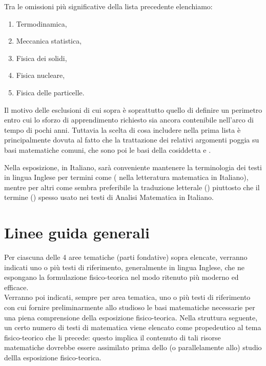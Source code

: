 Tra le omissioni più significative della lista precedente elenchiamo: 
\begin{enumerate}[(1)]
\item Termodinamica,
\item Meccanica statistica,
\item Fisica dei solidi,
\item Fisica nucleare, 
\item Fisica delle particelle. 
\end{enumerate} 

Il motivo delle esclusioni di cui sopra è soprattutto quello di definire un perimetro entro cui lo sforzo di apprendimento richiesto sia ancora contenibile nell'arco di tempo di pochi anni. Tuttavia la scelta di cosa includere nella prima lista è principalmente dovuta al fatto che la trattazione dei relativi argomenti poggia su basi matematiche comuni, che sono poi le basi della cosiddetta   e . 

Nella esposizione, in Italiano, sarà conveniente mantenere la terminologia dei testi in lingua Inglese per termini come  ( nella letteratura matematica in Italiano), mentre per altri come  sembra preferibile la traduzione letterale () piuttosto che il termine () spesso usato nei testi di Analisi Matematica in Italiano.    

\section{Linee guida generali}\label{app:A0.1}

Per ciascuna delle 4 aree tematiche (parti fondative) sopra elencate, verranno indicati uno o più testi di riferimento, generalmente in lingua Inglese, che ne espongano la formulazione fisico-teorica nel modo ritenuto più moderno ed efficace.\\
Verranno poi indicati, sempre per area tematica, uno o più testi di riferimento con cui fornire preliminarmente allo studioso le basi matematiche necessarie per una piena comprensione della esposizione fisico-teorica. Nella struttura seguente, un certo numero di testi di matematica viene elencato come propedeutico al tema fisico-teorico che li precede: questo implica il contenuto di tali risorse matematiche dovrebbe essere assimilato prima dello (o parallelamente allo) studio dellla esposizione fisico-teorica.    

